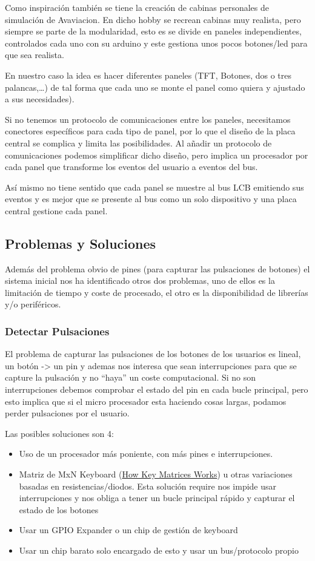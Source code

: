 Como inspiración también se tiene la creación de cabinas personales de simulación de Avaviacion. En dicho hobby
se recrean cabinas muy realista, pero siempre se parte de la modularidad, esto es se divide en paneles
independientes, controlados cada uno con su arduino y este gestiona unos pocos botones/led para que sea realista. 

En nuestro caso la idea es hacer diferentes paneles (TFT, Botones, dos o tres palancas,…) de tal forma que cada
uno se monte el panel como quiera y ajustado a sus necesidades).

Si no tenemos un protocolo de comunicaciones entre los paneles, necesitamos conectores específicos para cada tipo
de panel, por lo que el diseño de la placa central se complica y limita las posibilidades. Al añadir un protocolo
de comunicaciones podemos simplificar dicho diseño, pero implica un procesador por cada panel que transforme los
eventos del usuario a eventos del bus.

Así mismo no tiene sentido que cada panel se muestre al bus LCB emitiendo sus eventos y es mejor que se presente
al bus como un solo dispositivo y una placa central gestione cada panel. 

\subsection{Problemas y Soluciones}
Además del problema obvio de pines (para capturar las pulsaciones de botones) el sistema inicial nos ha
identificado otros dos problemas, uno de ellos es la limitación de tiempo y coste de procesado, el otro es
la disponibilidad de librerías y/o periféricos.

\subsubsection{Detectar Pulsaciones}
El problema de capturar las pulsaciones de los botones de los usuarios es lineal, un botón -> un pin y ademas
nos interesa que sean interrupciones para que se capture la pulsación y no “haya” un coste computacional. Si no
son interrupciones debemos comprobar el estado del pin en cada bucle principal, pero esto implica que si el micro
procesador esta haciendo cosas largas, podamos perder pulsaciones por el usuario. 

Las posibles soluciones son 4:
\begin{itemize}
    \item Uso de un procesador más poniente, con más pines e interrupciones.
    \item Matriz de MxN Keyboard  (\href{https://pcbheaven.com/wikipages/How_Key_Matrices_Works/}{How Key
    Matrices Works}) u otras variaciones basadas en resistencias/diodos. Esta solución require nos impide usar
    interrupciones y nos obliga a tener un bucle principal rápido y capturar el estado de los botones
    \item Usar un GPIO Expander o un chip de gestión de keyboard
    \item Usar un chip barato solo encargado de esto y usar un bus/protocolo propio
\end{itemize}

